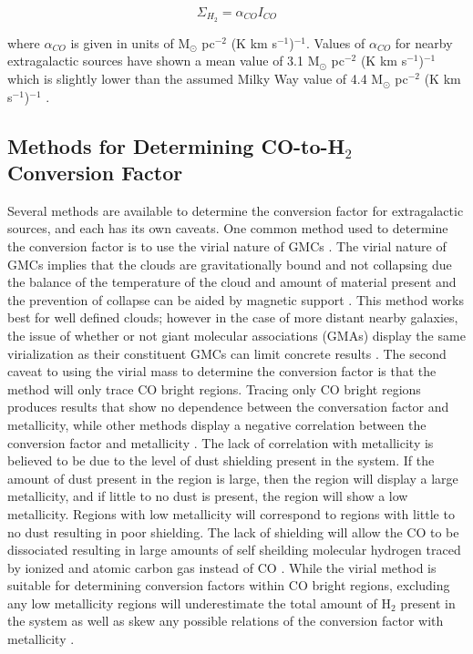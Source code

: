 \begin{equation}\label{eq:alpha}
  \Sigma_{H_2} = \alpha_{CO} I_{CO}
\end{equation}

where $\alpha_{CO}$ is given in units of M$_\odot$ pc$^{-2}$ (K km s$^{-1}$)$^{-1}$.   Values of $\alpha_{CO}$ for nearby extragalactic sources have shown a mean value of 3.1 M$_\odot$ pc$^{-2}$ (K km s$^{-1}$)$^{-1}$ which is slightly lower than the assumed Milky Way value of 4.4 M$_\odot$ pc$^{-2}$ (K km s$^{-1}$)$^{-1}$ \citep{sandstrom2013}.

\subsection{Methods for Determining CO-to-H$_2$ Conversion Factor}\label{gettinx}

Several methods are available to determine the conversion factor for extragalactic sources, and each has its own caveats.  One common method used to determine the conversion factor is to use the virial nature of GMCs \citep{bolatto2013}.  The virial nature of GMCs implies that the clouds are gravitationally bound and not collapsing due the balance of the temperature of the cloud and amount of material present and the prevention of collapse can be aided by magnetic support \citep{mckee2007}.  This method works best for well defined clouds; however in the case of more distant nearby galaxies, the issue of whether or not giant molecular associations (GMAs) display the same virialization as their constituent GMCs can limit concrete results \citep{bolatto2013}.  The second caveat to using the virial mass to determine the conversion factor is that the method will only trace CO bright regions.   Tracing only CO bright regions produces results that show no dependence between the conversation factor and metallicity, while other methods display a negative correlation between the conversion factor and metallicity  \citep{bolatto2013}.  The lack of correlation with metallicity is believed to be due to the level of dust shielding present in the system.  If the amount of dust present in the region is large, then the region will display a large metallicity, and if little to no dust is present, the region will show a low metallicity. Regions with low metallicity will correspond to regions with little to no dust resulting in poor shielding.  The lack of shielding will allow the CO to be dissociated resulting in large amounts of self sheilding molecular hydrogen traced by ionized and atomic carbon gas instead of CO \citep{bolatto2013}.  While the virial method is suitable for determining conversion factors within CO bright regions, excluding any low metallicity regions will underestimate the total amount of H$_2$ present in the system as well as skew any possible relations of the conversion factor with metallicity \citep{bolatto2013}.

